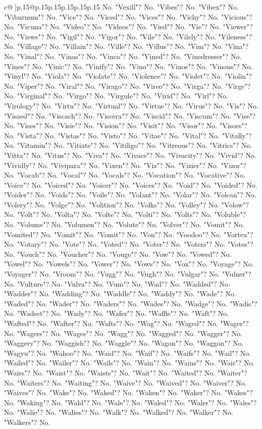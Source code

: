 \documentclass{article}
\begin{document}
{\begin{supertabular}{c@{$\;$}|p{.15\linewidth}@{}p{.15\linewidth}p{.15\linewidth}p{.15\linewidth}p{.15\linewidth}p{.15\linewidth}}
{{{No. "Vexill"? No. "Vibes"? No. "Vibex"? No. "Viburnum"? No. "Vice"? No. "Viced"? No. "Vices"? No. "Vichy"? No. "Vicious"? No. "Vicuna"? No. "Video"? No. "Videos"? No. "Vied"? No. "Vie"? No. "Viewer"? No. "Views"? No. "Vigil"? No. "Vigor"? No. "Vile"? No. "Vilely"? No. "Vileness"? No. "Village"? No. "Villain"? No. "Ville"? No. "Villus"? No. "Vim"? No. "Vina"? No. "Vinal"? No. "Vinas"? No. "Vinca"? No. "Vined"? No. "Vinedresser"? No. "Vines"? No. "Vinic"? No. "Vinify"? No. "Vino"? No. "Vinos"? No. "Vinous"? No. "Vinyl"? No. "Viola"? No. "Violate"? No. "Violence"? No. "Violet"? No. "Violin"? No. "Viper"? No. "Viral"? No. "Virago"? No. "Vireo"? No. "Virga"? No. "Virge"? No. "Virginal"? No. "Virgo"? No. "Virgule"? No. "Virid"? No. "Virl"? No. "Virology"? No. "Virtu"? No. "Virtual"? No. "Virtue"? No. "Virus"? No. "Vis"? No. "Visaed"? No. "Viscach"? No. "Viscera"? No. "Viscid"? No. "Viscum"? No. "Vise"? No. "Vises"? No. "Visie"? No. "Vision"? No. "Visit"? No. "Visor"? No. "Visors"? No. "Vista"? No. "Vistas"? No. "Visto"? No. "Vitae"? No. "Vital"? No. "Vitally"? No. "Vitamin"? No. "Vitiate"? No. "Vitiligo"? No. "Vitreous"? No. "Vitrics"? No. "Vitta"? No. "Vitus"? No. "Viva"? No. "Vivace"? No. "Vivacity"? No. "Vivid"? No. "Vividly"? No. "Vivipara"? No. "Vixen"? No. "Viz"? No. "Vizier"? No. "Vizor"? No. "Vocab"? No. "Vocal"? No. "Vocals"? No. "Vocation"? No. "Vocative"? No. "Voice"? No. "Voiced"? No. "Voicer"? No. "Voices"? No. "Void"? No. "Voided"? No. "Voider"? No. "Voids"? No. "Voile"? No. "Volant"? No. "Volar"? No. "Volcan"? No. "Volery"? No. "Volge"? No. "Volition"? No. "Volks"? No. "Volley"? No. "Volow"? No. "Volt"? No. "Volta"? No. "Volte"? No. "Volti"? No. "Volts"? No. "Voluble"? No. "Volume"? No. "Volumen"? No. "Volute"? No. "Volver"? No. "Vomit"? No. "Vomited"? No. "Vomit"? No. "Vomit"? No. "Von"? No. "Voodoo"? No. "Vortex"? No. "Votary"? No. "Vote"? No. "Voted"? No. "Voter"? No. "Voters"? No. "Votes"? No. "Vouch"? No. "Voucher"? No. "Vouge"? No. "Vow"? No. "Vowed"? No. "Vowel"? No. "Vowels"? No. "Vower"? No. "Vows"? No. "Vox"? No. "Voyage"? No. "Voyager"? No. "Vroom"? No. "Vugg"? No. "Vugh"? No. "Vulgar"? No. "Vulner"? No. "Vulture"? No. "Vulva"? No. "Vum"? No. "Wad"? No. "Wadded"? No. "Wadder"? No. "Wadding"? No. "Waddle"? No. "Waddy"? No. "Wade"? No. "Waded"? No. "Wader"? No. "Waders"? No. "Wades"? No. "Wadge"? No. "Wadis"? No. "Wadset"? No. "Wady"? No. "Wafer"? No. "Waffle"? No. "Waft"? No. "Wafted"? No. "Wafter"? No. "Wafts"? No. "Wag"? No. "Waged"? No. "Wager"? No. "Wagers"? No. "Wages"? No. "Wagg"? No. "Wagged"? No. "Wagger"? No. "Waggery"? No. "Waggish"? No. "Waggle"? No. "Wagon"? No. "Waggon"? No. "Wagyu"? No. "Wahoo"? No. "Waid"? No. "Waif"? No. "Waifs"? No. "Wail"? No. "Wailed"? No. "Wailer"? No. "Wails"? No. "Wain"? No. "Wains"? No. "Wair"? No. "Wairs"? No. "Waist"? No. "Waists"? No. "Wait"? No. "Waited"? No. "Waiter"? No. "Waiters"? No. "Waiting"? No. "Waive"? No. "Waived"? No. "Waiver"? No. "Waives"? No. "Wake"? No. "Waked"? No. "Waken"? No. "Waker"? No. "Wakes"? No. "Waking"? No. "Wald"? No. "Wale"? No. "Waled"? No. "Waler"? No. "Wales"? No. "Walie"? No. "Walies"? No. "Walk"? No. "Walked"? No. "Walker"? No. "Walkers"? No. }}}
\end{supertabular}}
\end{document}
